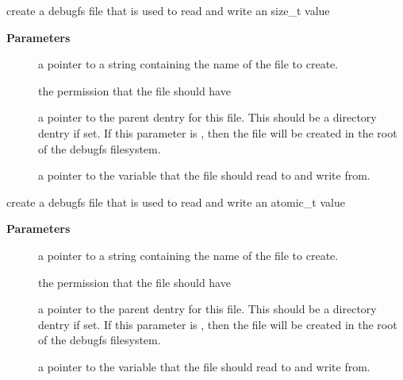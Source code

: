 \documentclass[a4paper,8pt,english]{sphinxmanual}
\begin{document}
\begin{fulllineitems}
\label{filesystems/index:c.debugfs_create_size_t}
create a debugfs file that is used to read and write an size\_t value

\end{fulllineitems}


\textbf{Parameters}
\begin{description}
\item[{}] \leavevmode
a pointer to a string containing the name of the file to create.

\item[{}] \leavevmode
the permission that the file should have

\item[{}] \leavevmode
a pointer to the parent dentry for this file.  This should be a
directory dentry if set.  If this parameter is , then the
file will be created in the root of the debugfs filesystem.

\item[{}] \leavevmode
a pointer to the variable that the file should read to and write
from.

\end{description}

\begin{fulllineitems}
\label{filesystems/index:c.debugfs_create_atomic_t}
create a debugfs file that is used to read and write an atomic\_t value

\end{fulllineitems}


\textbf{Parameters}
\begin{description}
\item[{}] \leavevmode
a pointer to a string containing the name of the file to create.

\item[{}] \leavevmode
the permission that the file should have

\item[{}] \leavevmode
a pointer to the parent dentry for this file.  This should be a
directory dentry if set.  If this parameter is , then the
file will be created in the root of the debugfs filesystem.

\item[{}] \leavevmode
a pointer to the variable that the file should read to and write
from.

\end{description}
\end{document}
